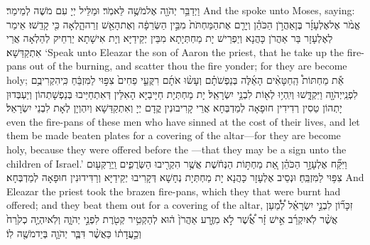 \newperek
{}%
{וַיְדַבֵּ֥ר יְהֹוָ֖ה אֶל\maqqaf מֹשֶׁ֥ה לֵּאמֹֽר׃}
{וּמַלֵּיל יְיָ עִם מֹשֶׁה לְמֵימַר׃}
{And the \lord\space spoke unto Moses, saying:}{}
{אֱמֹ֨ר אֶל\maqqaf אֶלְעָזָ֜ר בֶּן\maqqaf אַהֲרֹ֣ן הַכֹּהֵ֗ן וְיָרֵ֤ם אֶת\maqqaf הַמַּחְתֹּת֙ מִבֵּ֣ין הַשְּׂרֵפָ֔ה וְאֶת\maqqaf הָאֵ֖שׁ זְרֵה\maqqaf הָ֑לְאָה כִּ֖י קָדֵֽשׁוּ׃}
{אֵימַר לְאֶלְעָזָר בַּר אַהֲרֹן כָּהֲנָא וְיַפְרֵישׁ יָת מַחְתְּיָתָא מִבֵּין יְקֵידַיָּא וְיָת אִישָׁתָא יַרְחֵיק לְהַלְאָה אֲרֵי אִתְקַדַּשָׁא׃}
{‘Speak unto Eleazar the son of Aaron the priest, that he take up the fire-pans out of the burning, and scatter thou the fire yonder; for they are become holy;}{}
{אֵ֡ת מַחְתּוֹת֩ הַֽחַטָּאִ֨ים הָאֵ֜לֶּה בְּנַפְשֹׁתָ֗ם וְעָשׂ֨וּ אֹתָ֜ם רִקֻּעֵ֤י פַחִים֙ צִפּ֣וּי לַמִּזְבֵּ֔חַ כִּֽי\maqqaf הִקְרִיבֻ֥ם לִפְנֵֽי\maqqaf יְהֹוָ֖ה וַיִּקְדָּ֑שׁוּ וְיִֽהְי֥וּ לְא֖וֹת לִבְנֵ֥י יִשְׂרָאֵֽל׃}
{יָת מַחְתְּיָת חַיָּיבַיָּא הָאִלֵּין דְּאִתְחַיַּיבוּ בְּנַפְשָׁתְהוֹן וְיַעְבְּדוּן יָתְהוֹן טַסִין רְדִידִין חוּפָאָה לְמַדְבְּחָא אֲרֵי קָרִיבוּנִין קֳדָם יְיָ וְאִתְקַדַּשָׁא וְיִהְוְיָן לְאָת לִבְנֵי יִשְׂרָאֵל׃}
{even the fire-pans of these men who have sinned at the cost of their lives, and let them be made beaten plates for a covering of the altar—for they are become holy, because they were offered before the \lord—that they may be a sign unto the children of Israel.’}{}
{וַיִּקַּ֞ח אֶלְעָזָ֣ר הַכֹּהֵ֗ן אֵ֚ת מַחְתּ֣וֹת הַנְּחֹ֔שֶׁת אֲשֶׁ֥ר הִקְרִ֖יבוּ הַשְּׂרֻפִ֑ים וַֽיְרַקְּע֖וּם צִפּ֥וּי לַמִּזְבֵּֽחַ׃}
{וּנְסֵיב אֶלְעָזָר כָּהֲנָא יָת מַחְתְּיָת נְחָשָׁא דְּקָרִיבוּ יְקֵידַיָּא וְרַדִּידוּנִין חוּפָאָה לְמַדְבְּחָא׃}
{And Eleazar the priest took the brazen fire-pans, which they that were burnt had offered; and they beat them out for a covering of the altar,}{}
{זִכָּר֞וֹן לִבְנֵ֣י יִשְׂרָאֵ֗ל לְ֠מַ֠עַן אֲשֶׁ֨ר לֹֽא\maqqaf יִקְרַ֜ב אִ֣ישׁ זָ֗ר אֲ֠שֶׁ֠ר לֹ֣א מִזֶּ֤רַע אַהֲרֹן֙ ה֔וּא לְהַקְטִ֥יר קְטֹ֖רֶת לִפְנֵ֣י יְהֹוָ֑ה וְלֹֽא\maqqaf יִהְיֶ֤ה כְקֹ֙רַח֙ וְכַ֣עֲדָת֔וֹ כַּאֲשֶׁ֨ר דִּבֶּ֧ר יְהֹוָ֛ה בְּיַד\maqqaf מֹשֶׁ֖ה לֽוֹ׃ \petucha }
